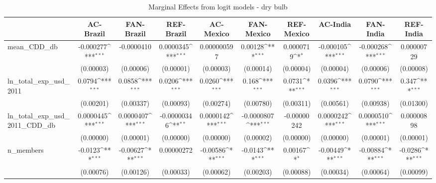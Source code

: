 \begin{table}[htbp]\centering
\def\sym#1{\ifmmode^{#1}\else\(^{#1}\)\fi}
\caption{Marginal Effects from logit models - dry bulb}
\begin{tabular}{l*{9}{c}}
\hline\hline
            &\multicolumn{1}{c}{AC-Brazil}&\multicolumn{1}{c}{FAN-Brazil}&\multicolumn{1}{c}{REF-Brazil}&\multicolumn{1}{c}{AC-Mexico}&\multicolumn{1}{c}{FAN-Mexico}&\multicolumn{1}{c}{REF-Mexico}&\multicolumn{1}{c}{AC-India}&\multicolumn{1}{c}{FAN-India}&\multicolumn{1}{c}{REF-India}\\
\hline
mean\_CDD\_db &   -0.000277\sym{***}&  -0.0000410         &   0.0000345\sym{***}& 0.000000597         &     0.00128\sym{***}&   0.0000719\sym{*}  &   -0.000105\sym{***}&   -0.000268\sym{***}&  0.00000729         \\
            &   (0.00003)         &   (0.00006)         &   (0.00001)         &   (0.00003)         &   (0.00014)         &   (0.00004)         &   (0.00004)         &   (0.00006)         &   (0.00008)         \\
ln\_total\_exp\_usd\_2011&      0.0794\sym{***}&      0.0858\sym{***}&      0.0206\sym{***}&      0.0260\sym{***}&       0.168\sym{***}&      0.0731\sym{***}&      0.0396\sym{***}&      0.0790\sym{***}&       0.347\sym{***}\\
            &   (0.00201)         &   (0.00337)         &   (0.00093)         &   (0.00274)         &   (0.00780)         &   (0.00311)         &   (0.00561)         &   (0.00938)         &   (0.01300)         \\
ln\_total\_exp\_usd\_2011\_CDD\_db&   0.0000445\sym{***}&   0.0000407\sym{***}& -0.00000346\sym{**} &   0.0000142\sym{***}&  -0.0000807\sym{***}& -0.00000242         &   0.0000242\sym{***}&   0.0000510\sym{***}&  0.00000898         \\
            &   (0.00000)         &   (0.00001)         &   (0.00000)         &   (0.00000)         &   (0.00002)         &   (0.00000)         &   (0.00000)         &   (0.00001)         &   (0.00001)         \\
n\_members   &     -0.0123\sym{***}&    -0.00627\sym{***}&  0.00000272         &    -0.00586\sym{***}&     -0.0143\sym{***}&     0.00167\sym{*}  &    -0.00449\sym{***}&    -0.00884\sym{***}&     -0.0286\sym{***}\\
            &   (0.00076)         &   (0.00126)         &   (0.00033)         &   (0.00062)         &   (0.00203)         &   (0.00088)         &   (0.00034)         &   (0.00064)         &   (0.00099)         \\

\end{tabular}
\end{table}
